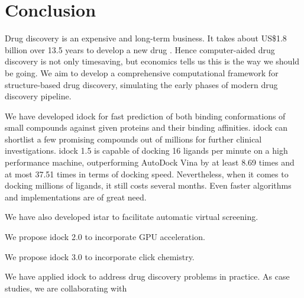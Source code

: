 \chapter{Conclusion}

Drug discovery is an expensive and long-term business. It takes about US\$1.8 billion over 13.5 years to develop a new drug \citep{716}. Hence computer-aided drug discovery is not only timesaving, but economics tells us this is the way we should be going. We aim to develop a comprehensive computational framework for structure-based drug discovery, simulating the early phases of modern drug discovery pipeline.

We have developed idock for fast prediction of both binding conformations of small compounds against given proteins and their binding affinities. idock can shortlist a few promising compounds out of millions for further clinical investigations. idock 1.5 is capable of docking 16 ligands per minute on a high performance machine, outperforming AutoDock Vina \citep{595} by at least 8.69 times and at most 37.51 times in terms of docking speed. Nevertheless, when it comes to docking millions of ligands, it still costs several months. Even faster algorithms and implementations are of great need.

We have also developed istar to facilitate automatic virtual screening. 

We propose idock 2.0 to incorporate GPU acceleration.

We propose idock 3.0 to incorporate click chemistry.

We have applied idock to address drug discovery problems in practice. As case studies, we are collaborating with 

\chapterend
